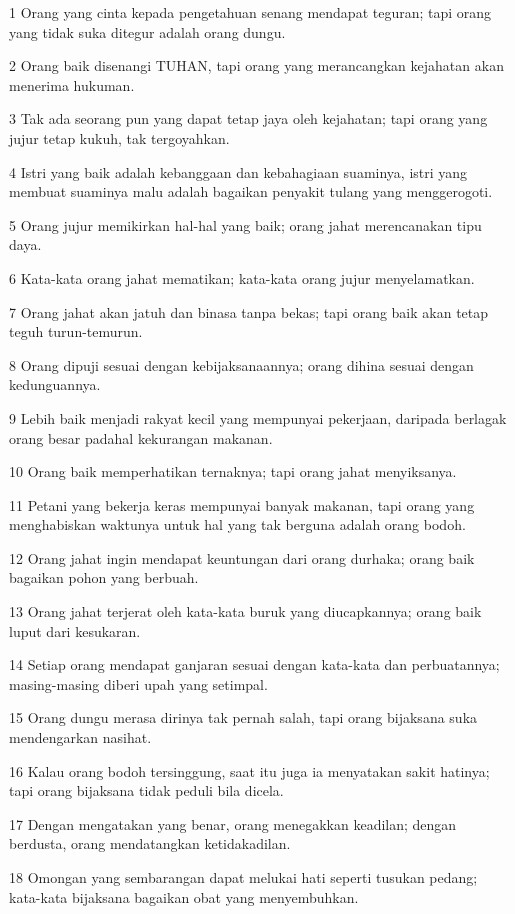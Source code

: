 \par 1 Orang yang cinta kepada pengetahuan senang mendapat teguran; tapi orang yang tidak suka ditegur adalah orang dungu.
\par 2 Orang baik disenangi TUHAN, tapi orang yang merancangkan kejahatan akan menerima hukuman.
\par 3 Tak ada seorang pun yang dapat tetap jaya oleh kejahatan; tapi orang yang jujur tetap kukuh, tak tergoyahkan.
\par 4 Istri yang baik adalah kebanggaan dan kebahagiaan suaminya, istri yang membuat suaminya malu adalah bagaikan penyakit tulang yang menggerogoti.
\par 5 Orang jujur memikirkan hal-hal yang baik; orang jahat merencanakan tipu daya.
\par 6 Kata-kata orang jahat mematikan; kata-kata orang jujur menyelamatkan.
\par 7 Orang jahat akan jatuh dan binasa tanpa bekas; tapi orang baik akan tetap teguh turun-temurun.
\par 8 Orang dipuji sesuai dengan kebijaksanaannya; orang dihina sesuai dengan kedunguannya.
\par 9 Lebih baik menjadi rakyat kecil yang mempunyai pekerjaan, daripada berlagak orang besar padahal kekurangan makanan.
\par 10 Orang baik memperhatikan ternaknya; tapi orang jahat menyiksanya.
\par 11 Petani yang bekerja keras mempunyai banyak makanan, tapi orang yang menghabiskan waktunya untuk hal yang tak berguna adalah orang bodoh.
\par 12 Orang jahat ingin mendapat keuntungan dari orang durhaka; orang baik bagaikan pohon yang berbuah.
\par 13 Orang jahat terjerat oleh kata-kata buruk yang diucapkannya; orang baik luput dari kesukaran.
\par 14 Setiap orang mendapat ganjaran sesuai dengan kata-kata dan perbuatannya; masing-masing diberi upah yang setimpal.
\par 15 Orang dungu merasa dirinya tak pernah salah, tapi orang bijaksana suka mendengarkan nasihat.
\par 16 Kalau orang bodoh tersinggung, saat itu juga ia menyatakan sakit hatinya; tapi orang bijaksana tidak peduli bila dicela.
\par 17 Dengan mengatakan yang benar, orang menegakkan keadilan; dengan berdusta, orang mendatangkan ketidakadilan.
\par 18 Omongan yang sembarangan dapat melukai hati seperti tusukan pedang; kata-kata bijaksana bagaikan obat yang menyembuhkan.
